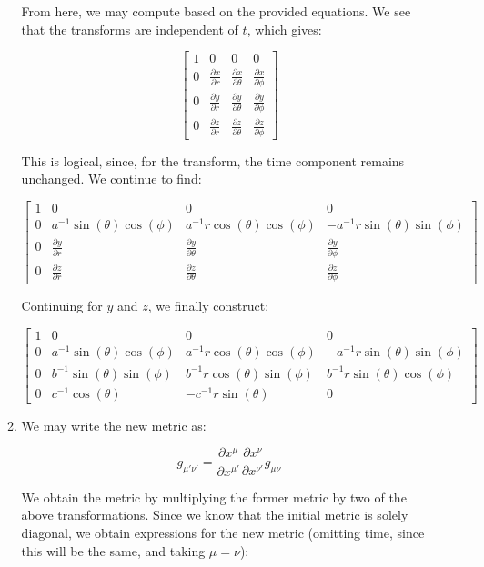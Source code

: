 \begin{enumerate}
\begin{enumerate}
        From here, we may compute based on the provided equations. We see that the transforms are independent of $t$, which gives:

        $$\left[ \begin{matrix} 1 & 0 & 0 & 0\\ 0 & \frac{\partial x}{\partial r} & \frac{\partial x}{\partial \theta} & \frac{\partial x}{\partial \phi}\\0 & \frac{\partial y}{\partial r} & \frac{\partial y}{\partial \theta} & \frac{\partial y}{\partial \phi}\\0 & \frac{\partial z}{\partial r} & \frac{\partial z}{\partial \theta} & \frac{\partial z}{\partial \phi}\end{matrix} \right]$$

        This is logical, since, for the transform, the time component remains unchanged. We continue to find:

        $$\left[ \begin{matrix} 1 & 0 & 0 & 0\\ 0 & a^{-1}\sin(\theta)\cos(\phi) & a^{-1}r\cos(\theta)\cos(\phi) & -a^{-1}r\sin(\theta)\sin(\phi)\\0 & \frac{\partial y}{\partial r} & \frac{\partial y}{\partial \theta} & \frac{\partial y}{\partial \phi}\\0 & \frac{\partial z}{\partial r} & \frac{\partial z}{\partial \theta} & \frac{\partial z}{\partial \phi}\end{matrix} \right]$$

        Continuing for $y$ and $z$, we finally construct:

        $$\boxed{\left[ \begin{matrix} 1 & 0 & 0 & 0\\ 0 & a^{-1}\sin(\theta)\cos(\phi) & a^{-1}r\cos(\theta)\cos(\phi) & -a^{-1}r\sin(\theta)\sin(\phi)\\0 & b^{-1}\sin(\theta)\sin(\phi) & b^{-1}r\cos(\theta)\sin(\phi) & b^{-1}r\sin(\theta)\cos(\phi)\\0 & c^{-1}\cos(\theta) & -c^{-1}r\sin(\theta) & 0\end{matrix} \right]}$$

      \item 

        We may write the new metric as:

        $$g_{\mu'\nu'}=\frac{\partial x^{\mu}}{\partial x^{\mu'}}\frac{\partial x^{\nu}}{\partial x^{\nu'}}g_{\mu\nu}$$

        We obtain the metric by multiplying the former metric by two of the above transformations. Since we know that the initial metric is solely diagonal, we obtain expressions for the new metric (omitting time, since this will be the same, and taking $\mu=\nu$):


\end{enumerate}
\end{enumerate}
